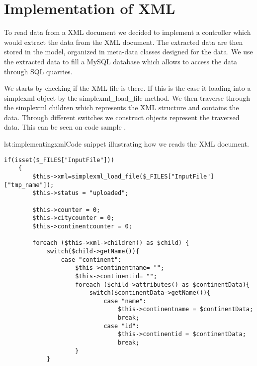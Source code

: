 \section{Implementation of XML}
To read data from a XML document we decided to implement a controller which would extract the data from the XML document. The extracted data are then stored in the model, organized in meta-data classes designed for the data. We use the extracted data to fill a MySQL database which allows to access the data through SQL quarries.

We starts by checking if the XML file is there. If this is the case it loading into a simplexml object by the simplexml\_load\_file method. We then traverse through the simplexml children which represents the XML structure and contains the data. Through different switches we construct objects represent the traversed data. This can be seen on code sample .

\begin{code}{lst:implementingxml}{Code snippet illustrating how we reads the XML document.}
\begin{lstlisting}
if(isset($_FILES["InputFile"]))
	{
    	$this->xml=simplexml_load_file($_FILES["InputFile"]["tmp_name"]);
        $this->status = "uploaded";

	    $this->counter = 0;
	    $this->citycounter = 0;
	    $this->continentcounter = 0;

	    foreach ($this->xml->children() as $child) {
	    	switch($child->getName()){
	   			case "continent":
	  				$this->continentname= "";
	    			$this->continentid= "";
	    			foreach ($child->attributes() as $continentData){
	    				switch($continentData->getName()){
	    					case "name":
	    						$this->continentname = $continentData;
	    						break;
    						case "id":
	    						$this->continentid = $continentData;
	    						break;
					}
  			}
\end{lstlisting}
\end{code}
